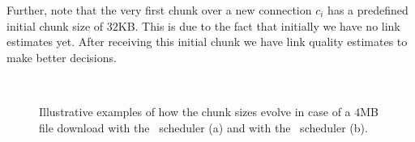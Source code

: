 Further, note that the very first chunk over a new connection $c_i$ has a predefined initial chunk size of $32$KB. 
This is due to the fact that initially we have no link estimates yet. 
After receiving this initial chunk we have link quality estimates to make better decisions. 

\begin{figure}[t]
		\begin{minipage}[t]{0.5\linewidth}
		\begin{center}
        \end{center}
        \end{minipage}
~
        \begin{minipage}[t]{0.5\linewidth}
        \begin{center}
        \end{center}
        \end{minipage}
        \caption{\label{fig:scheduler-flows} Illustrative examples of how the chunk sizes evolve in case of a $4$MB file download with the \algalpha~scheduler (a) and with the \algslice~scheduler (b).}
  \vspace*{-0.3cm}
\end{figure}

